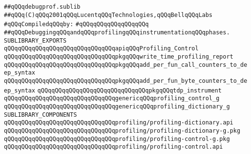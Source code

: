 \label{src/lib/compiler/debugging-and-profiling/debugprof.sublib}
\verb|##qQQqdebugprof.sublib|\newline
\verb|##qQQq(C)qQQq2001qQQqLucentqQQqTechnologies,qQQqBellqQQqLabs|\newline
\newline
\verb|#qQQqCompiledqQQqby:|\newline
\verb|#qQQqqQQqqQQqqQQqqQQq|\newline
\newline
\verb|##qQQqDebuggingqQQqandqQQqprofilingqQQqinstrumentationqQQqphases.|\newline
\newline
\verb|SUBLIBRARY_EXPORTS|\newline
\newline
\verb|qQQqqQQqqQQqqQQqqQQqqQQqqQQqqQQqapiqQQqProfiling_Control|\newline
\newline
\verb|qQQqqQQqqQQqqQQqqQQqqQQqqQQqqQQqpkgqQQqwrite_time_profiling_report|\newline
\verb|qQQqqQQqqQQqqQQqqQQqqQQqqQQqqQQqpkgqQQqadd_per_fun_call_counters_to_deep_syntax|\newline
\verb|qQQqqQQqqQQqqQQqqQQqqQQqqQQqqQQqpkgqQQqadd_per_fun_byte_counters_to_deep_syntax|\newline
\verb|qQQqqQQqqQQqqQQqqQQqqQQqqQQqqQQqpkgqQQqtdp_instrument|\newline
\newline
\verb|qQQqqQQqqQQqqQQqqQQqqQQqqQQqqQQqgenericqQQqprofiling_control_g|\newline
\verb|qQQqqQQqqQQqqQQqqQQqqQQqqQQqqQQqgenericqQQqprofiling_dictionary_g|\newline
\newline
\newline
\newline
\verb|SUBLIBRARY_COMPONENTS|\newline
\newline
\verb|qQQqqQQqqQQqqQQqqQQqqQQqqQQqqQQqprofiling/profiling-dictionary.api|\newline
\verb|qQQqqQQqqQQqqQQqqQQqqQQqqQQqqQQqprofiling/profiling-dictionary-g.pkg|\newline
\verb|qQQqqQQqqQQqqQQqqQQqqQQqqQQqqQQqprofiling/profiling-control-g.pkg|\newline
\verb|qQQqqQQqqQQqqQQqqQQqqQQqqQQqqQQqprofiling/profiling-control.api|\newline
